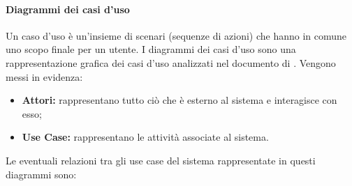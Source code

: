 \paragraph*{Diagrammi dei casi d'uso}
Un caso d'uso è un'insieme di scenari (sequenze di azioni) che hanno in comune uno scopo finale per un utente. I diagrammi dei casi d'uso sono una rappresentazione grafica dei casi d'uso analizzati nel documento di \textit{\AdR}. Vengono messi in evidenza:
\begin{itemize}
	\item \textbf{Attori:} rappresentano tutto ciò che è esterno al sistema e interagisce con esso;
	\item \textbf{Use Case:} rappresentano le attività associate al sistema.
\end{itemize}
Le eventuali relazioni tra gli use case del sistema rappresentate in questi diagrammi sono: 
